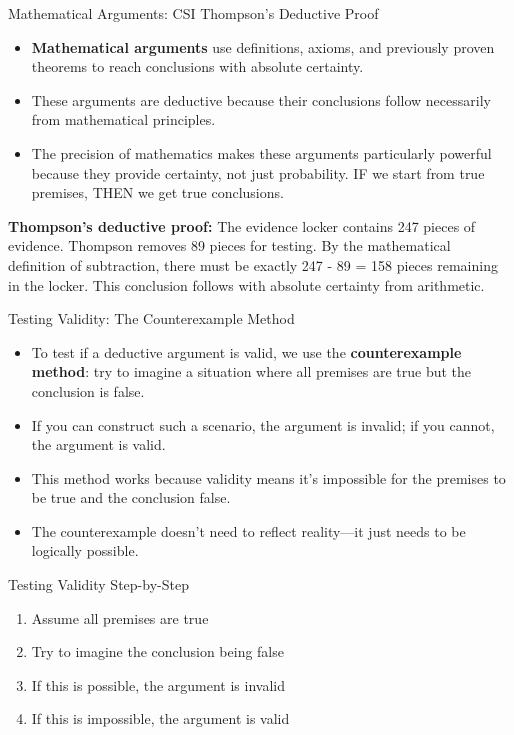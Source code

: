 \documentclass{beamer}
\begin{document}
\begin{frame}{Mathematical Arguments: CSI Thompson's Deductive Proof}
	\begin{itemize}
		\item \textbf{Mathematical arguments} use definitions, axioms, and previously proven theorems to reach conclusions with absolute certainty.
		\item These arguments are deductive because their conclusions follow necessarily from mathematical principles.
		\item The precision of mathematics makes these arguments particularly powerful because they provide certainty, not just probability. IF we start from true premises, THEN we get true conclusions.
	\end{itemize}
	
	\begin{example}
		\textbf{Thompson's deductive proof:}
		The evidence locker contains 247 pieces of evidence. Thompson removes 89 pieces for testing. By the mathematical definition of subtraction, there must be exactly 247 - 89 = 158 pieces remaining in the locker. This conclusion follows with absolute certainty from arithmetic.
	\end{example}
\end{frame}

	\begin{frame}{Testing Validity: The Counterexample Method}
		\begin{itemize}
			\item To test if a deductive argument is valid, we use the \textbf{counterexample method}: try to imagine a situation where all premises are true but the conclusion is false.
			\item If you can construct such a scenario, the argument is invalid; if you cannot, the argument is valid.
			\item This method works because validity means it's impossible for the premises to be true and the conclusion false.
			\item The counterexample doesn't need to reflect reality—it just needs to be logically possible.
		\end{itemize}
		
		\begin{block}{Testing Validity Step-by-Step}
			\begin{enumerate}
				\item Assume all premises are true
				\item Try to imagine the conclusion being false
				\item If this is possible, the argument is invalid
				\item If this is impossible, the argument is valid
			\end{enumerate}
		\end{block}
	\end{frame}
	
\end{document}
